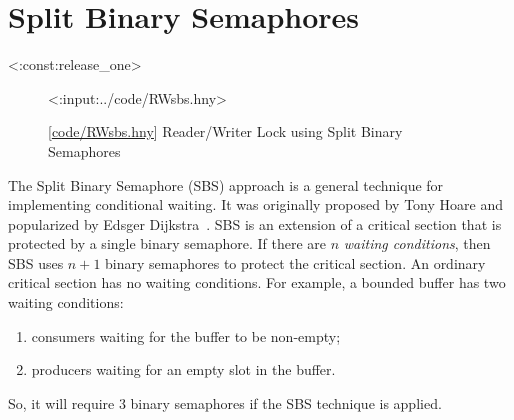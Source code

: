 \documentclass{report}
\newcommand{\harmonylink}[1]{%
[\href{https://harmony.cs.cornell.edu/#1}{\underline{#1}}]%
}
\newenvironment{code}{
\tcolorbox
}{
\endtcolorbox
}
\begin{document}
{

\chapter{Split Binary Semaphores}
\label{ch:sbs}
%

<{:const:release_one}>

\begin{figure}
\begin{code}
<{:input:../code/RWsbs.hny}>
\end{code}
\caption{\harmonylink{code/RWsbs.hny} Reader/Writer Lock using Split Binary Semaphores}
\label{fig:RWsplitsema}
\end{figure}

%

The Split Binary Semaphore (SBS) approach is a general technique for
implementing conditional waiting.  It was originally proposed by
Tony Hoare and popularized by Edsger Dijkstra~\cite{EWD703}.
SBS is an extension of a critical section that is protected by a single
binary semaphore.
If there are $n$ \emph{waiting conditions},
then SBS uses $n+1$ binary semaphores to protect the critical section.
An ordinary critical section has no waiting conditions.
For example, a bounded buffer has two waiting conditions:
\begin{enumerate}
\item consumers waiting for the buffer to be non-empty;
\item producers waiting for an empty slot in the buffer.
\end{enumerate}
So, it will require 3 binary semaphores if the SBS technique is applied.

}
\end{document}
